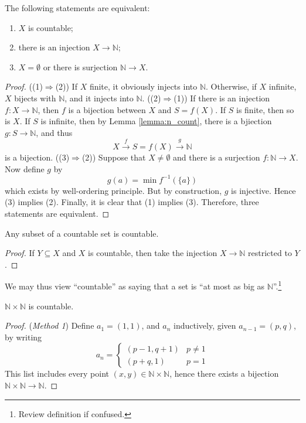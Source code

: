 \documentclass[10pt, a4paper, twoside]{report}
\begin{document}
\begin{theorem}
    The following statements are equivalent:
    \begin{enumerate}
        \item \(X\) is countable;
        \item there is an injection \(X\to\mathbb{N}\);
        \item \(X=\emptyset\) or there is surjection \(\mathbb{N}\to X\).
    \end{enumerate}
    \label{thm:countable_equiv}
\end{theorem}
\begin{proof} 
    ((1)\(\Rightarrow\)(2)) If \(X\) finite, it obviously injects into \(\mathbb{N}\). Otherwise, if \(X\) infinite, \(X\) bijects with \(\mathbb{N}\), and it injects into \(\mathbb{N}\). \newline 
    ((2)\(\Rightarrow\)(1)) If there is an injection \(f:X\to\mathbb{N}\), then \(f\) is a bijection between \(X\) and \(S=f(X)\). If \(S\) is finite, then so is \(X\). If \(S\) is infinite, then by Lemma \ref{lemma:n_count}, there is a bjiection \(g:S\to\mathbb{N}\), and thus 
    \[X\xrightarrow{f}S=f(X)\xrightarrow{g}\mathbb{N}\]
    is a bijection. \newline 
    ((3)\(\Rightarrow\)(2)) Suppose that \(X\neq\emptyset\) and there is a surjection \(f:\mathbb{N}\to X\). Now define \(g\) by 
    \[g(a)=\min f^{-1}(\{a\})\]
    which exists by well-ordering principle. But by construction, \(g\) is injective. Hence (3) implies (2). \newline 
    Finally, it is clear that (1) implies (3). Therefore, three statements are equivalent.
\end{proof}
\begin{corollary}
    Any subset of a countable set is countable.
\end{corollary}
\begin{proof}
    If \(Y\subseteq X\) and \(X\) is countable, then take the injection \(X\to\mathbb{N}\) restricted to \(Y\).
\end{proof}
We may thus view ``countable'' as saying that a set is ``at most as big as \(\mathbb{N}\)''.\footnote{Review definition if confused.}
\begin{theorem}
    \(\mathbb{N}\times\mathbb{N}\) is countable.
\end{theorem}
\begin{proof}
    (\emph{Method 1}) Define \(a_1=(1,1)\), and \(a_n\) inductively, given \(a_{n-1}=(p,q)\), by writing 
    \[a_n=\begin{cases}
        (p-1,q+1) & p\neq 1 \\
        (p+q,1) & p=1
    \end{cases}\]
    This list includes every point \((x,y)\in\mathbb{N}\times\mathbb{N}\), hence there exists a bijection \(\mathbb{N}\times\mathbb{N}\to\mathbb{N}\).
\end{proof}
\end{document}
